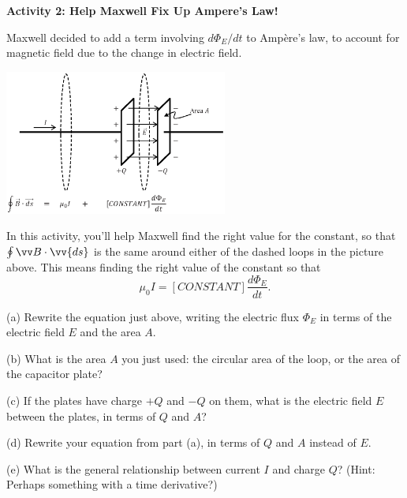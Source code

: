 \pagebreak
\textbf{Activity 2: Help Maxwell Fix Up Ampere's Law!}

Maxwell decided to add a term involving $d\Phi_E/dt$ to Amp\`ere's law, to account for magnetic field due to the change in electric field.
\begin{center}
\vspace{-0.2in}
    \includegraphics[width=0.55\textwidth]{deriving_em_waves/two_loops_with_equation.eps}
\vspace{-0.1in}
\end{center}

In this activity, you'll help Maxwell find the right value for the constant, so that $\oint \vv B \cdot \vv{ds}$ is the same around either of the dashed loops in the picture above.  This means finding the right value of the constant so that
\begin{displaymath}
\mu_0I = [CONSTANT] \frac{d\Phi_E}{dt}.
\end{displaymath}

\vspace{-0.1in}
(a) Rewrite the equation just above, writing the electric flux $\Phi_E$ in terms of the electric field $E$ and the area $A$.
\vspace{0.4in}

(b) What is the area $A$ you just used: the circular area of the loop, or the area of the capacitor plate?
\vspace{0.3in}

(c) If the plates have charge $+Q$ and $-Q$ on them, what is the electric field $E$ between the plates, in terms of $Q$ and $A$?
\vspace{0.6in}

(d) Rewrite your equation from part (a), in terms of $Q$ and $A$ instead of $E$.
\vspace{0.5in}

(e) What is the general relationship between current $I$ and charge $Q$? (Hint: Perhaps something with a time derivative?)
\vspace{0.3in}

